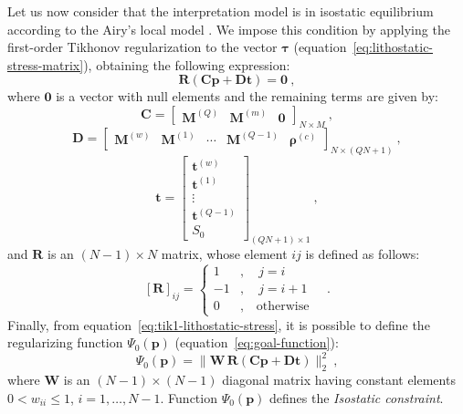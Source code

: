 \documentclass[manuscript]{geophysics}
\begin{document}
Let us now consider that the interpretation model is in isostatic equilibrium
according to the Airy's local model \citep[e.g.,][]{turcotte-schubert2002,
hofmann-wellenhof-moritz2005, lowrie2007}. We impose this condition 
by applying the first-order Tikhonov regularization
\citep{aster-etal2005} to the vector $\boldsymbol{\tau}$
(equation~\ref{eq:lithostatic-stress-matrix}), obtaining the
following expression:
\begin{equation}
\mathbf{R} \left( \mathbf{C} \mathbf{p} + \mathbf{D} \mathbf{t} \right) = \mathbf{0} 
\: ,
\label{eq:tik1-lithostatic-stress}
\end{equation}
where $\mathbf{0}$ is a vector with null elements and the remaining terms are given by:
\begin{equation}
\mathbf{C} = \begin{bmatrix}
\mathbf{M}^{(Q)} & \mathbf{M}^{(m)} & \mathbf{0}
\end{bmatrix}_{N \times M} \: ,
\label{eq:matrix-C}
\end{equation}
\begin{equation}
\mathbf{D} = \begin{bmatrix}
\mathbf{M}^{(w)} & \mathbf{M}^{(1)} & \cdots & \mathbf{M}^{(Q-1)} &
\boldsymbol{\rho}^{(c)}
\end{bmatrix}_{N \times \left( QN + 1 \right)} \: ,
\label{eq:matrix-D}
\end{equation}
\begin{equation}
\mathbf{t} = \begin{bmatrix}
\mathbf{t}^{(w)} \\ \mathbf{t}^{(1)} \\ \vdots \\ \mathbf{t}^{(Q-1)} \\ S_{0}
\end{bmatrix}_{\left( QN + 1 \right) \times 1}\: ,
\label{eq:vector-t}
\end{equation}
and $\mathbf{R}$ is an $\left( N-1 \right) \times N$ matrix, whose element 
$ij$ is defined as follows:
\begin{equation}
\left[ \mathbf{R} \right]_{ij} = \begin{cases}
1 &, \quad j = i \\
-1 &, \quad j = i + 1 \\
0 &, \quad \text{otherwise}
\end{cases} \quad .
\label{eq:matrix-R}
\end{equation}
Finally, from equation~\ref{eq:tik1-lithostatic-stress}, it is possible to
define the regularizing function $\Psi_{0}(\mathbf{p})$ 
(equation~\ref{eq:goal-function}): 
\begin{equation}
\Psi_{0}(\mathbf{p}) = \| \mathbf{W} \, \mathbf{R} \left( \mathbf{C} \mathbf{p} + \mathbf{D}
\mathbf{t} \right) \|_{2}^{2} \: ,
\label{eq:isostatic-constraint-function}
\end{equation}
where $\mathbf{W}$ is an $(N - 1) \times (N - 1)$ diagonal matrix having constant
elements $0 < w_{ii} \le 1$, $i = 1, \dots, N - 1$. 
Function $\Psi_{0}(\mathbf{p})$ defines the \textit{Isostatic constraint}.
\end{document}
